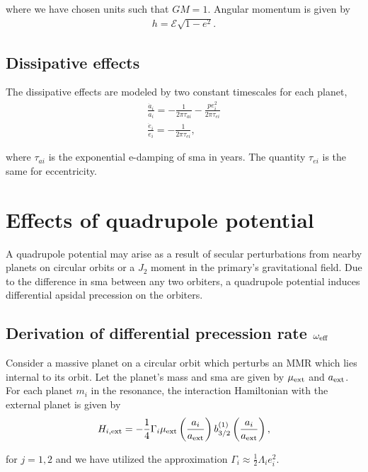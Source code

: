 \documentclass[11pt]{article}
\begin{document}
\noindent
where we have chosen units such that \(GM=1\).
Angular momentum is given by
\begin{align}
h = \mathcal E \sqrt{1-e^2}.
\end{align}

\subsection{Dissipative effects}
\label{sec:org1f42a89}
The dissipative effects are modeled
by two constant timescales for each planet, 
\begin{align}
  \frac{\dot a_i}{a_i} = -\frac{1}{2\pi\tau_{ai}} - \frac{pe_i^2}{2\pi\tau_{ei}} \\
  \frac{\dot e_i}{e_i} = -\frac{1}{2\pi\tau_{ei}} ,
\end{align}

where \(\tau_{ai}\) is the exponential e-damping of sma in years.  The
quantity \(\tau_{ei}\) is the same for eccentricity.

\section{Effects of quadrupole potential}
\label{sec:orgdd2d5cd}
A quadrupole potential may arise as a result of secular perturbations
from nearby planets on circular orbits or a \(J_2\) moment in the
primary's gravitational field. Due to the difference in sma
between any two orbiters, a quadrupole potential induces
differential apsidal precession on the orbiters.

\subsection{Derivation of differential precession rate \(\omega_{\rm eff}\)}
\label{sec:orgf4d7fd0}
Consider a massive planet on a circular orbit which perturbs an MMR
which lies internal to its orbit.  Let the planet's mass and sma are
given by \(\mu_{\rm ext}\) and \(a_{\rm ext}\).  For each planet \(m_i\) in
the resonance, the interaction Hamiltonian with the external
planet is given by
\begin{equation}
  H_{i,\rm ext} = -\frac14 \Gamma_i \mu_{\rm ext}
  \left(\frac{a_i}{a_{\rm ext}}\right) b_{3/2}^{(1)}\left(\frac{a_i}{a_{\rm ext}}\right),
\end{equation}

\noindent
for \(j=1,2\) and we have utilized the approximation \(\Gamma_i \approx \frac12 \Lambda_i e_i^2\).
\end{document}
